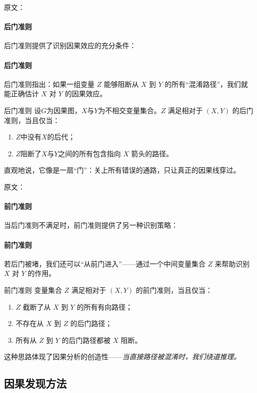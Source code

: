 原文：
\paragraph{后门准则}
后门准则提供了识别因果效应的充分条件：
\paragraph{后门准则}
后门准则指出：如果一组变量 $Z$ 能够阻断从 $X$ 到 $Y$ 的所有“混淆路径”，我们就能正确估计 $X$ 对 $Y$ 的因果效应。  
\begin{definition}[]{后门准则}
设$G$为因果图，$X$与$Y$为不相交变量集合。$Z$ 满足相对于 $(X,Y)$ 的后门准则，当且仅当：
\begin{enumerate}
\item $Z$中没有$X$的后代；
\item $Z$阻断了$X$与$Y$之间的所有包含指向 $X$ 箭头的路径。
\end{enumerate}
\end{definition}
直观地说，它像是一扇“门”：关上所有错误的通路，只让真正的因果线穿过。

原文：
\paragraph{前门准则}
当后门准则不满足时，前门准则提供了另一种识别策略：
\paragraph{前门准则}
若后门被堵，我们还可以“从前门进入”——通过一个中间变量集合 $Z$ 来帮助识别 $X$ 对 $Y$ 的作用。  
\begin{definition}[]{前门准则}
变量集合 $Z$ 满足相对于 $(X,Y)$ 的前门准则，当且仅当：
\begin{enumerate}
\item $Z$ 截断了从 $X$ 到 $Y$ 的所有有向路径；
\item 不存在从 $X$ 到 $Z$ 的后门路径；
\item 所有从 $Z$ 到 $Y$ 的后门路径都被 $X$ 阻断。
\end{enumerate}
\end{definition}
这种思路体现了因果分析的创造性——\emph{当直接路径被混淆时，我们绕道推理。}

\subsection{因果发现方法}

